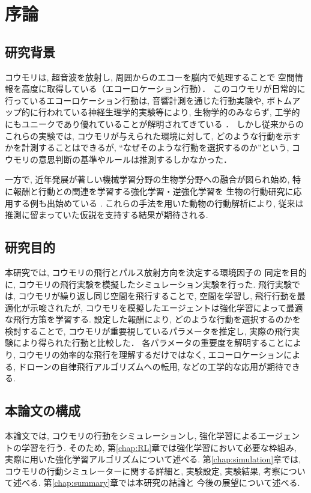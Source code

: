 \documentclass[../main]{subfiles}
\begin{document}
\newpage
\chapter{序論}


\section{研究背景}
コウモリは, 超音波を放射し, 周囲からのエコーを脳内で処理することで
空間情報を高度に取得している（エコーロケーション行動）．
このコウモリが日常的に行っているエコーロケーション行動は, 
音響計測を通じた行動実験や, 
ボトムアップ的に行われている神経生理学的実験等により, 
生物学的のみならず, 
工学的にもユニークであり優れていることが解明されてきている
\cite{ref:bat_enhance}\cite{ref:echolocating_bats}．
しかし従来からのこれらの実験では, 
コウモリが与えられた環境に対して, 
どのような行動を示すかを計測することはできるが, 
“なぜそのような行動を選択するのか”という, 
コウモリの意思判断の基準やルールは推測するしかなかった．

一方で, 近年発展が著しい機械学習分野の生物学分野への融合が図られ始め, 
特に報酬と行動との関連を学習する強化学習・逆強化学習を
生物の行動研究に応用する例も出始めている
\cite{ref:simulating_bout}\cite{ref:can_ai}.
これらの手法を用いた動物の行動解析により, 
従来は推測に留まっていた仮説を支持する結果が期待される.


\section{研究目的}
本研究では, コウモリの飛行とパルス放射方向を決定する環境因子の
同定を目的に, コウモリの飛行実験を模擬したシミュレーション実験を行った.
飛行実験では, コウモリが繰り返し同じ空間を飛行することで, 
空間を学習し, 飛行行動を最適化が示唆されたが, 
コウモリを模擬したエージェントは強化学習によって最適な飛行方策を学習する.
設定した報酬により, どのような行動を選択するのかを検討することで, 
コウモリが重要視しているパラメータを推定し, 
実際の飛行実験により得られた行動と比較した．
各パラメータの重要度を解明することにより, 
コウモリの効率的な飛行を理解するだけではなく, 
エコーロケーションによる, 
ドローンの自律飛行アルゴリズムへの転用, 
などの工学的な応用が期待できる.


\section{本論文の構成}
本論文では, コウモリの行動をシミュレーションし, 
強化学習によるエージェントの学習を行う.
そのため, 第\ref{chap:RL}章では強化学習において必要な枠組み, 
実際に用いた強化学習アルゴリズムについて述べる.
第\ref{chap:simulation}章では, 
コウモリの行動シミュレーターに関する詳細と, 
実験設定, 実験結果, 考察について述べる.
第\ref{chap:summary}章では本研究の結論と
今後の展望について述べる.
\end{document}
